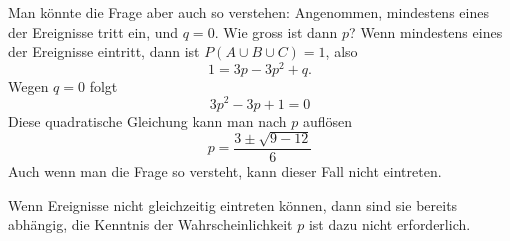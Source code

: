 \begin{loesung}
\begin{teilaufgaben}
Man könnte die Frage aber auch so verstehen: Angenommen, mindestens
eines der Ereignisse tritt ein, und $q=0$. Wie gross ist dann $p$?
Wenn mindestens eines der Ereignisse eintritt, dann ist
$P(A\cup B\cup C)=1$, also
\[
1=3p-3p^2+q.
\]
Wegen $q=0$ folgt
\[
3p^2-3p+1=0
\]
Diese quadratische Gleichung kann man nach $p$ auflösen
\[
p=\frac{3\pm\sqrt{9-12}}{6}
\]
Auch wenn man die Frage so versteht, kann dieser Fall nicht eintreten.
\item
Wenn Ereignisse nicht gleichzeitig eintreten können, dann sind
sie bereits abhängig, die Kenntnis der Wahrscheinlichkeit $p$
ist dazu nicht erforderlich.
\qedhere
\end{teilaufgaben}
\end{loesung}

